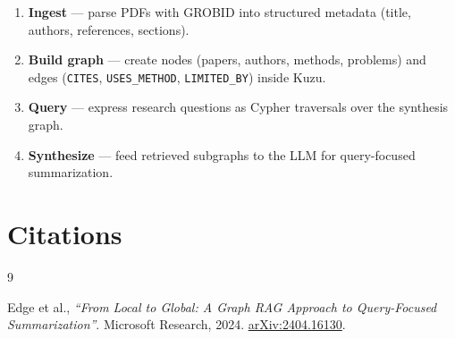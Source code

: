 \documentclass[11pt]{article}
\begin{document}
\begin{enumerate}[label=\arabic*.]
  \item \textbf{Ingest} --- parse PDFs with GROBID into structured
        metadata (title, authors, references, sections).
  \item \textbf{Build graph} --- create nodes (papers, authors, methods,
        problems) and edges (\texttt{CITES}, \texttt{USES\_METHOD},
        \texttt{LIMITED\_BY}) inside Kuzu.
  \item \textbf{Query} --- express research questions as Cypher
        traversals over the synthesis graph.
  \item \textbf{Synthesize} --- feed retrieved subgraphs to the LLM for
        query-focused summarization.
\end{enumerate}

\section*{Citations}

\begin{thebibliography}{9}

Edge et al.,
\emph{``From Local to Global: A Graph RAG Approach to Query-Focused
Summarization''}.
Microsoft Research, 2024.
\href{https://arxiv.org/abs/2404.16130}{arXiv:2404.16130}.

\end{thebibliography}
\end{document}
